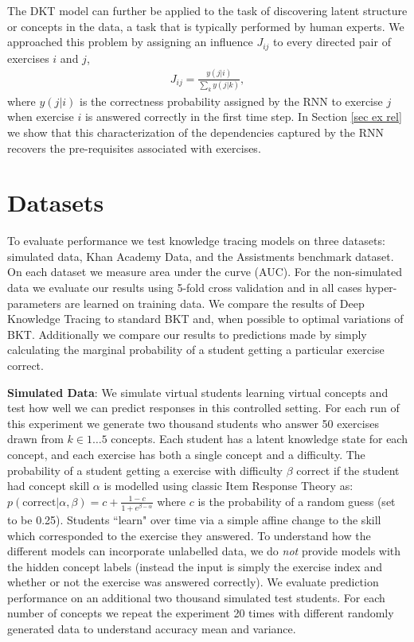 The DKT model can further be applied to the task of discovering latent structure or concepts in the data, a task that is typically performed by human experts.
We approached this problem by assigning an influence $J_{ij}$ to every directed pair of exercises $i$ and $j$,
\begin{align}
\label{eq influence}
J_{ij} = \frac{y\left(j|i\right)}{\sum_k y\left(j|k\right)},
\end{align}
where $y\left(j|i\right)$ is the correctness probability assigned by the RNN to exercise $j$ when exercise $i$ is answered correctly in the first time step.
In Section \ref{sec ex rel} we show that this characterization of the dependencies captured by the RNN recovers the pre-requisites associated with exercises.





\section{Datasets}

To evaluate performance we test knowledge tracing models on three datasets: simulated data, Khan Academy Data, and the Assistments benchmark dataset. On each dataset we measure area under the curve (AUC). For the non-simulated data we evaluate our results using 5-fold cross validation and in all cases hyper-parameters are learned on training data. We compare the results of Deep Knowledge Tracing to standard BKT and, when possible to optimal variations of BKT. Additionally we compare our results to predictions made by simply calculating the marginal probability of a student getting a particular exercise correct.

\textbf{Simulated Data}: We simulate virtual students learning virtual concepts and test how well we can predict responses in this controlled setting.
For each run of this experiment we generate two thousand students who answer 50 exercises drawn from $k \in {1 \dots 5}$ concepts.
Each student has a latent knowledge state for each concept, and each exercise has both a single concept and a difficulty.
The probability of a student getting a exercise with difficulty $\beta$ correct if the student had concept skill $\alpha$ is modelled using classic Item Response Theory \cite{drasgow1990item} as:
       $p(\text{correct} | \alpha, \beta) = c + \frac{1 - c}{1 + e^{\beta -\alpha}}$
where $c$ is the probability of a random guess (set to be 0.25). Students ``learn" over time via a simple affine change to the skill which corresponded to the exercise they answered. To understand how the different models can incorporate unlabelled data, we do \emph{not} provide models with the hidden concept labels (instead the input is simply the exercise index and whether or not the exercise was answered correctly). We evaluate prediction performance on an additional two thousand simulated test students. For each number of concepts we repeat the experiment 20 times with different randomly generated data to understand accuracy mean and variance.

